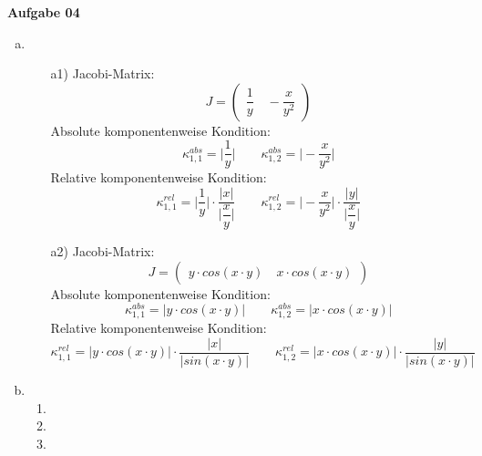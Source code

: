 \documentclass[a4paper,10pt]{article}
\begin{document}
	\newpage
	\textbf{Aufgabe 04}\\
	\begin{enumerate}[a)]
		\item
			\begin{enumerate}
				\item[a1)]
				Jacobi-Matrix:
				\[
				J = 
				\begin{pmatrix}
					\dfrac{1}{y} \quad -\dfrac{x}{y^2}
				\end{pmatrix}
				\]
				Absolute komponentenweise Kondition:
				\[
				\kappa^{abs}_{1,1} = \Big\vert \dfrac{1}{y} \Big\vert \quad\quad \kappa^{abs}_{1,2} = \Big\vert -\dfrac{x}{y^2} \Big \vert
				\]
				Relative komponentenweise Kondition:
				\[
				\kappa^{rel}_{1,1} = \Big\vert \dfrac{1}{y}\Big\vert \cdot \dfrac{\vert x \vert}{\Big \vert \dfrac{x}{y} \Big\vert} \quad\quad \kappa^{rel}_{1,2} = \Big\vert -\dfrac{x}{y^2}\Big\vert \cdot \dfrac{\vert y \vert}{\Big \vert \dfrac{x}{y} \Big\vert}
				\]
				\item[a2)]
				Jacobi-Matrix:
				\[
				J = 
				\begin{pmatrix}
					y \cdot cos(x \cdot y) \quad x \cdot cos(x \cdot y)
				\end{pmatrix}
				\]
				Absolute komponentenweise Kondition:
				\[
				\kappa^{abs}_{1,1} = \Big\vert y \cdot cos(x \cdot y) \Big\vert \quad\quad \kappa^{abs}_{1,2} = \Big\vert x \cdot cos(x \cdot y) \Big \vert
				\]
				Relative komponentenweise Kondition:
				\[
				\kappa^{rel}_{1,1} = \Big\vert y \cdot cos(x \cdot y) \Big\vert \cdot \dfrac{\vert x \vert}{\Big \vert sin(x \cdot y) \Big\vert} \quad\quad \kappa^{rel}_{1,2} = \Big\vert x \cdot cos(x \cdot y) \Big\vert \cdot \dfrac{\vert y \vert}{\Big \vert sin(x \cdot y) \Big\vert}
				\]
			\end{enumerate}
				\item
			\begin{enumerate}
				\item
				\item
				\item
			\end{enumerate}


	\end{enumerate}
	
	
\end{document}
